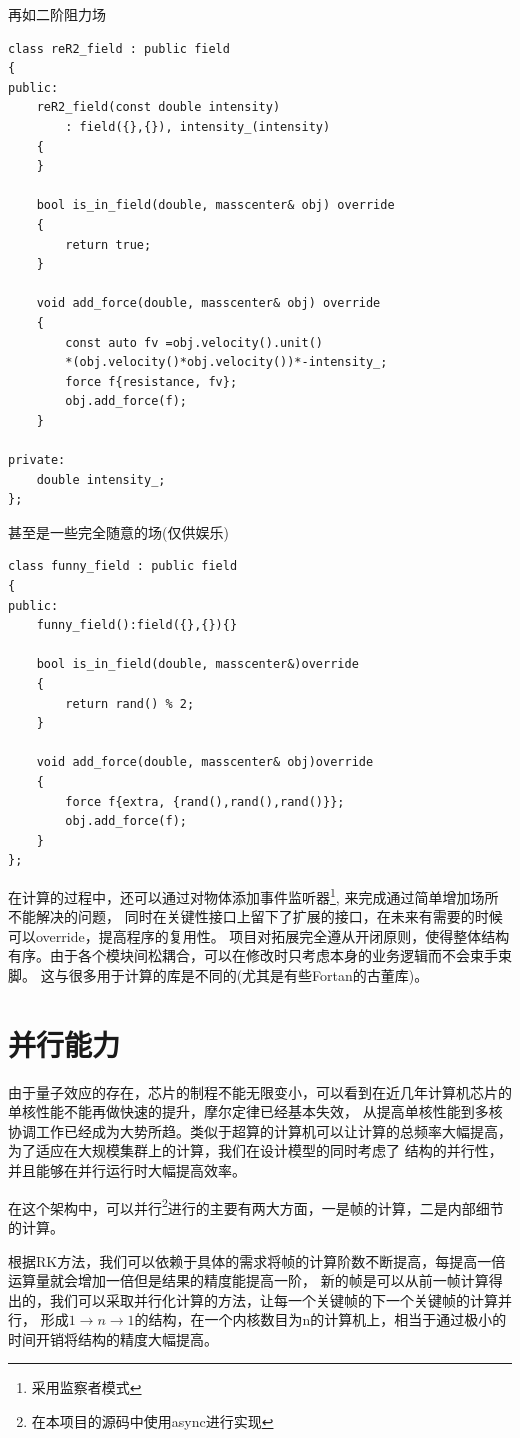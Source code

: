\noindent 再如二阶阻力场
{\setmainfont{Consolas}
\begin{lstlisting}
class reR2_field : public field
{
public:
    reR2_field(const double intensity)
        : field({},{}), intensity_(intensity)
    {
    }

    bool is_in_field(double, masscenter& obj) override
    {
        return true;
    }

    void add_force(double, masscenter& obj) override
    {
        const auto fv =obj.velocity().unit()
        *(obj.velocity()*obj.velocity())*-intensity_;
        force f{resistance, fv};
        obj.add_force(f);
    }

private:
    double intensity_;
};
\end{lstlisting}
}

\noindent 甚至是一些完全随意的场(仅供娱乐)
{\setmainfont{Consolas}
\begin{lstlisting}
class funny_field : public field
{
public:
    funny_field():field({},{}){}

    bool is_in_field(double, masscenter&)override
    {
        return rand() % 2;
    }

    void add_force(double, masscenter& obj)override
    {
        force f{extra, {rand(),rand(),rand()}};
        obj.add_force(f);
    }
};
\end{lstlisting}
}

在计算的过程中，还可以通过对物体添加事件监听器\footnote{采用监察者模式},
来完成通过简单增加场所不能解决的问题，
同时在关键性接口上留下了扩展的接口，在未来有需要的时候可以override，提高程序的复用性。
项目对拓展完全遵从开闭原则，使得整体结构有序。由于各个模块间松耦合，可以在修改时只考虑本身的业务逻辑而不会束手束脚。
这与很多用于计算的库是不同的(尤其是有些Fortan的古董库)。
\section{并行能力}
由于量子效应的存在，芯片的制程不能无限变小，可以看到在近几年计算机芯片的单核性能不能再做快速的提升，摩尔定律已经基本失效，
从提高单核性能到多核协调工作已经成为大势所趋。类似于超算的计算机可以让计算的总频率大幅提高，为了适应在大规模集群上的计算，我们在设计模型的同时考虑了
结构的并行性，并且能够在并行运行时大幅提高效率。

在这个架构中，可以并行\footnote{在本项目的源码中使用async进行实现}进行的主要有两大方面，一是帧的计算，二是内部细节的计算。

根据RK方法，我们可以依赖于具体的需求将帧的计算阶数不断提高，每提高一倍运算量就会增加一倍但是结果的精度能提高一阶，
新的帧是可以从前一帧计算得出的，我们可以采取并行化计算的方法，让每一个关键帧的下一个关键帧的计算并行，
形成$1\rightarrow n \rightarrow 1$的结构，在一个内核数目为n的计算机上，相当于通过极小的时间开销将结构的精度大幅提高。

